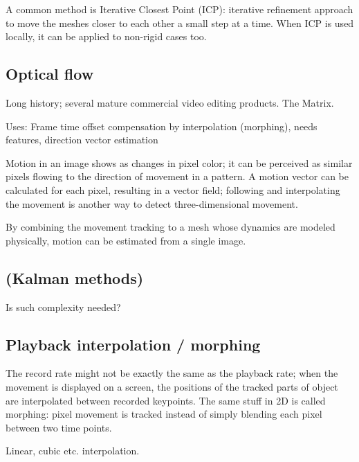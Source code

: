 A common method is Iterative Closest Point (ICP): iterative refinement approach to move the meshes closer to each other a small step at a time.
When ICP is used locally, it can be applied to non-rigid cases too. \cite{brown2007global}


\subsection{Optical flow} %

Long history; several mature commercial video editing products. The Matrix.

Uses: Frame time offset compensation by interpolation (morphing), needs features, direction vector estimation

Motion in an image shows as changes in pixel color; it can be perceived as similar pixels flowing to the direction of movement in a pattern.
A motion vector can be calculated for each pixel, resulting in a vector field; following and interpolating the movement is another way to detect three-dimensional movement.
\cite{gibson1950perception,horn1981determining,beauchemin1995computation}

By combining the movement tracking to a mesh whose dynamics are modeled physically, motion can be estimated from a single image.
\cite{decarlo1996integration}


\subsection{(Kalman methods)} %

Is such complexity needed?


\subsection{Playback interpolation / morphing} %

The record rate might not be exactly the same as the playback rate; when the movement is displayed on a screen, the positions of the tracked parts of object are interpolated between recorded keypoints.
The same stuff in 2D is called morphing: pixel movement is tracked instead of simply blending each pixel between two time points.

Linear, cubic etc. interpolation.

